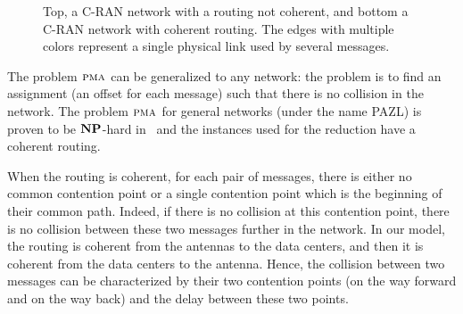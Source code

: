 \documentclass[pdflatex,sn-mathphys,iicol]{sn-jnl}%
\theoremstyle{thmstyleone}%
\theoremstyle{thmstyletwo}%
\theoremstyle{thmstylethree}%
\begin{document}
\begin{figure}
\begin{center}







 \caption{Top, a C-RAN network with a routing not coherent, and bottom a C-RAN network with coherent routing. The edges with multiple colors represent a single physical link used by several messages.}

\label{fig:coherent}
\end{center}
\end{figure}


The problem $\textsc{pma}$ can be generalized to any network: the problem is to find an assignment (an offset for each message) such that there is no collision in the network. The problem $\textsc{pma}$ for general networks (under the name \textsc{PAZL}) is proven to be $\textbf{NP}$-hard in~\cite{bartharxiv2018deterministic} and the instances used for the reduction have a coherent routing. 

When the routing is coherent, for each pair of messages, there is either no common contention point or a single contention point which is the beginning of their common path. Indeed, if there is no collision at this contention point, there is no collision between these two messages further in the network.
In our model, the routing is coherent from the antennas to the data centers, and then it is coherent from the data centers to the antenna. Hence, the collision between two messages can be characterized by their two contention points (on the way forward and on the way back) and the delay between these two points. 
\end{document}
